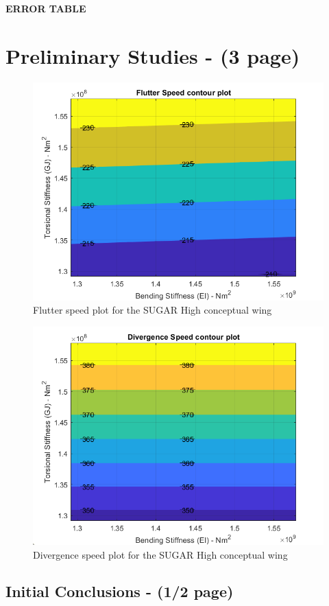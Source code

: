 \documentclass[11pt]{article}
\begin{document}
\textbf{ERROR TABLE}


\section{Preliminary Studies - (3 page)}
\begin{figure}[H]
    \centering
    \includegraphics[width = .7\textwidth]{figures/SUGAR-High_flutter.png}
    \caption{Flutter speed plot for the SUGAR High conceptual wing}
    \label{fig:SUGAR-flutter}
\end{figure}

\begin{figure}[H]
    \centering
    \includegraphics[width = .7\textwidth]{figures/SUGAR-High_divergence.png}
    \caption{Divergence speed plot for the SUGAR High conceptual wing}
    \label{fig:SUGAR-divergence}
\end{figure}

\subsection{Initial Conclusions - (1/2 page)}

\end{document}
